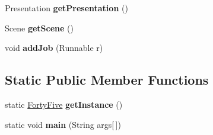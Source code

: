 \begin{DoxyCompactItemize}
\item 
\hypertarget{classdev_1_1boxy_1_1fortyfive_1_1_forty_five_a5eb7154a9ebfa31bdd9dad4f3c7cca71}{
Presentation {\bfseries getPresentation} ()}
\label{de/df3/classdev_1_1boxy_1_1fortyfive_1_1_forty_five_a5eb7154a9ebfa31bdd9dad4f3c7cca71}

\item 
\hypertarget{classdev_1_1boxy_1_1fortyfive_1_1_forty_five_a4e59f9811fd84e3cb0c2526614591faf}{
Scene {\bfseries getScene} ()}
\label{de/df3/classdev_1_1boxy_1_1fortyfive_1_1_forty_five_a4e59f9811fd84e3cb0c2526614591faf}

\item 
\hypertarget{classdev_1_1boxy_1_1fortyfive_1_1_forty_five_a9bed8371b8a8996cd0dfbe0f33af7587}{
void {\bfseries addJob} (Runnable r)}
\label{de/df3/classdev_1_1boxy_1_1fortyfive_1_1_forty_five_a9bed8371b8a8996cd0dfbe0f33af7587}

\end{DoxyCompactItemize}
\subsection*{Static Public Member Functions}
\begin{DoxyCompactItemize}
\item 
\hypertarget{classdev_1_1boxy_1_1fortyfive_1_1_forty_five_a0535c3739563bfa8db7a5300cf66fef5}{
static \hyperlink{classdev_1_1boxy_1_1fortyfive_1_1_forty_five}{FortyFive} {\bfseries getInstance} ()}
\label{de/df3/classdev_1_1boxy_1_1fortyfive_1_1_forty_five_a0535c3739563bfa8db7a5300cf66fef5}

\item 
\hypertarget{classdev_1_1boxy_1_1fortyfive_1_1_forty_five_ab6235e0bcae8473a6835ed0f7b0d8ac1}{
static void {\bfseries main} (String args\mbox{[}$\,$\mbox{]})}
\label{de/df3/classdev_1_1boxy_1_1fortyfive_1_1_forty_five_ab6235e0bcae8473a6835ed0f7b0d8ac1}

\end{DoxyCompactItemize}
